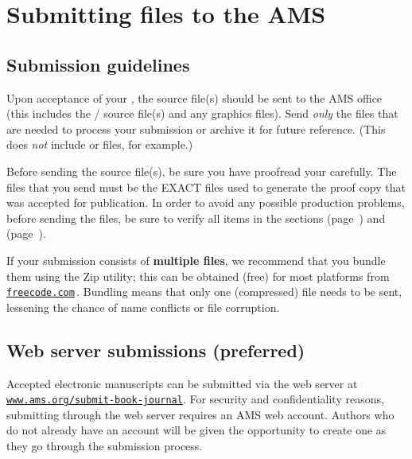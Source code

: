 
\chapter{Submitting files to the AMS}\label{ch:submit}

\section{Submission guidelines}

\noindent Upon acceptance of your 
, the source file(s) should be sent
to the AMS office (this includes the \tex/ 
source file(s) and any graphics files).  Send
\emph{only} the files that are needed to process your submission or archive
it for future reference.  (This does \emph{not} include  or
 files, for example.)

Before sending the source file(s), be sure you have proofread your 
 carefully. 
The files that you send must be the EXACT files
used to generate the proof copy that was accepted for publication.  In
order to avoid any possible production problems, before sending the files,
be sure to verify all items in the sections \textit{} (page~\pageref{sec:check}) and \textit{} (page~\pageref{sec:scheck}).

If your submission consists of \textbf{multiple files}, we recommend that
you bundle them using the Zip utility; this can be obtained (free) for
most platforms from \href{http://freecode.com}{\texttt{freecode.com}}\,.
Bundling means that only one (compressed) file needs to be sent, lessening
the chance of name conflicts or file corruption.

\section{Web server submissions (preferred)}
\noindent Accepted electronic manuscripts can be submitted via the web server
at\\
\href{http://www.ams.org/submit-book-journal}{\texttt{www.ams.org/submit-book-journal}}.
For security and confidentiality
reasons, submitting through the web server requires an AMS web account.
Authors who do not already have an account will be given the opportunity
to create one as they go through the submission process.


